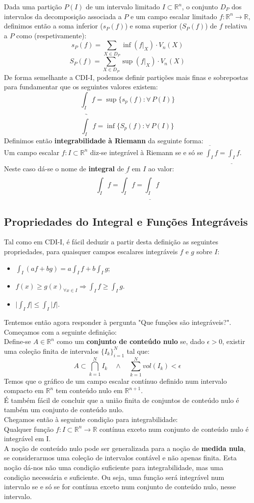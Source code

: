 \documentclass{article}
\newcommand{\R}{\mathbb{R}}
\begin{document}
Dada uma partição $P(I)$ de um intervalo limitado $I \subset \R^n$, o conjunto $D_P$ dos intervalos da decomposição associada a $P$ e um campo escalar limitado $f: \R^n \to \R$, definimos então a soma inferior ($s_P(f)$) e soma superior ($S_P(f)$) de $f$ relativa a $P$ como (respetivamente):
$$
s_P(f) = \sum_{X \in D_P} \inf(f|_X) \cdot V_n(X)
$$
$$
S_P(f) = \sum_{X \in D_P} \sup(f|_X) \cdot V_n(X)
$$
De forma semelhante a CDI-I, podemos definir partições mais finas e sobrepostas para fundamentar que os seguintes valores existem:
$$
\underline{\int_I} f = \sup \{ s_p(f): \forall \, P(I) \}
$$
$$
\overline{\int_I} f = \inf \{ S_p(f): \forall \, P(I) \}
$$
Definimos então \textbf{integrabilidade à Riemann} da seguinte forma:\\
Um campo escalar $f: I \subset \R^n$ diz-se integrável à Riemann se e só se $\overline{\int_I} f = \underline{\int_I} f$. Neste caso dá-se o nome de \textbf{integral} de $f$ em $I$ ao valor:
$$
\int_I f = \overline{\int_I} f = \underline{\int_I} f
$$

\subsection{Propriedades do Integral e Funções Integráveis}
Tal como em CDI-I, é fácil deduzir a partir desta definição as seguintes propriedades, para quaisquer campos escalares integráveis $f$ e $g$ sobre $I$:
\begin{itemize}
	\item $\int_I (af+bg) = a\int_I f + b \int_I g$;
	\item $f(x) \geq g(x) _{\forall x \in I} \Rightarrow \int_I f \geq \int_I g$.
	\item $\big| \int_I f \big| \leq \int_I |f|$.
\end{itemize}
Tentemos então agora responder à pergunta "Que funções são integráveis?". Começamos com a seguinte definição:\\
Define-se $A \in \R^n$ como um \textbf{conjunto de conteúdo nulo} se, dado $\epsilon >0$, existir uma coleção finita de intervalos $\{ I_k \}_{i=1}^N$ tal que:
$$
A \subset \bigcap_{k=1}^N I_k \quad \wedge \quad \sum_{k=1}^N vol(I_k) < \epsilon
$$
Temos que o gráfico de um campo escalar contínuo definido num intervalo compacto em $\R^n$ tem conteúdo nulo em $\R^{n+1}$.\\
É também fácil de concluir que a união finita de conjuntos de conteúdo nulo é também um conjunto de conteúdo nulo.\\
Chegamos então à seguinte condição para integrabilidade:\\
Qualquer função $f: I \subset \R^n \to \R$ contínua exceto num conjunto de conteúdo nulo é integrável em I.\\
A noção de conteúdo nulo pode ser generalizada para a noção de \textbf{medida nula}, se considerarmos uma coleção de intervalos contável e não apenas finita. Esta noção dá-nos não uma condição suficiente para integrabilidade, mas uma condição necessária e suficiente. Ou seja, uma função será integrável num intervalo se e só se for contínua exceto num conjunto de conteúdo nulo, nesse intervalo.\\ 
\end{document}
